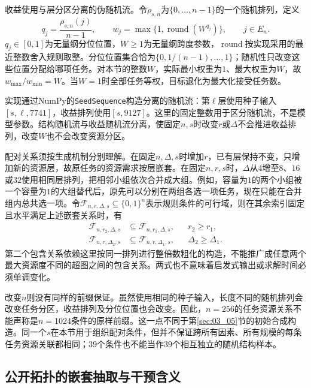 收益使用与层分区分离的伪随机流。令$\rho_{s,n}$为$\{0,\ldots,n-1\}$的一个随机排列，定义
\begin{equation}
 q_j=\frac{\rho_{s,n}(j)}{n-1},\qquad
 w_j=\max\{1,\operatorname{round}(W^{q_j})\},
 \qquad j\in E_n.
 \label{s0306:regular_weights}
\end{equation}
$q_j\in[0,1]$为无量纲分位位置，$W\geq1$为无量纲跨度参数，$\operatorname{round}$按实现采用的最近整数舍入规则取整。分位位置集合恰为$\{0,1/(n-1),\ldots,1\}$；随机性只改变这些位置分配给哪项任务。对本节的整数$W$，实际最小权重为$1$、最大权重为$W$，故$w_{\max}/w_{\min}=W$。当$W=1$时全部任务等权，目标退化为最大化接受任务数。

实现通过NumPy的\texttt{SeedSequence}构造分离的随机流：第$\ell$层使用种子输入$[s,\ell,7741]$，收益排列使用$[s,9127]$。这里的固定整数用于区分随机流，不是模型参数。结构随机流与收益随机流分离，使固定$n,s$时改变$r$或$\Delta$不会推进收益排列，改变$W$也不会改变资源分区。

配对关系须按生成机制分别理解。在固定$n,\Delta,s$时增加$r$，已有层保持不变，只增加新的资源层，故原任务的资源需求按层嵌套。在固定$n,r,s$时，$\Delta$从$4$增至$8$、$16$或$32$使用相同层排列，把相邻小组依次合并成大组。例如，容量为$1$的两个小组被一个容量为$1$的大组替代后，原先可以分别在两组各选一项任务，现在只能在合并组内总共选一项。令$\mathcal F_{n,r,\Delta,s}\subseteq\{0,1\}^n$表示规则条件的可行域，则在其余索引固定且水平满足上述嵌套关系时，有
\begin{align}
 \mathcal F_{n,r_2,\Delta,s}&\subseteq
 \mathcal F_{n,r_1,\Delta,s},&&r_2\geq r_1,
 \label{s0306:rank_nesting}\\
 \mathcal F_{n,r,\Delta_2,s}&\subseteq
 \mathcal F_{n,r,\Delta_1,s},&&\Delta_2\geq\Delta_1.
 \label{s0306:degree_nesting}
\end{align}
第二个包含关系依赖这里按同一排列进行整倍数粗化的构造，不能推广成任意两个最大资源度不同的超图之间的包含关系。两式也不意味着启发式输出或求解时间必须单调变化。

改变$n$则没有同样的前缀保证。虽然使用相同的种子输入，长度不同的随机排列会改变任务分区，收益排列及分位位置也会改变。因此，$n=256$的任务资源关系不能声称是$n=1024$条件的原样前缀。这一点不同于第\ref{sec:03_05}节的初始合成构造。同一个$s$在本节用于组织配对条件，但并不保证跨所有因素、所有规模的每条任务资源关联都相同；$39$个条件也不能当作$39$个相互独立的随机结构样本。

\subsection{公开拓扑的嵌套抽取与干预含义}

